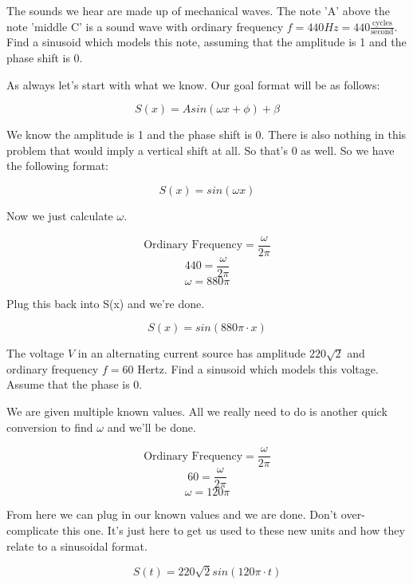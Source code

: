 \documentclass[10pt,letterpaper]{amspset}
\begin{document}

\begin{problem}[1]
    The sounds we hear are made up of mechanical waves. The note 'A' above the note 'middle C' is a sound wave with ordinary frequency $f = 440Hz = 440 \frac{\text{cycles}}{\text{second}}$. Find a sinusoid which models this note, assuming that the amplitude is 1 and the phase shift is 0.
\end{problem}

\begin{solution}
    As always let's start with what we know. Our goal format will be as follows: 
    
    \[S(x) = A sin(\omega x + \phi) + \beta\]
    
    We know the amplitude is 1 and the phase shift is 0. There is also nothing in this problem that would imply a vertical shift at all. So that's 0 as well. So we have the following format:
    
    \[S(x) = sin(\omega x) \]
    
    Now we just calculate $\omega$. 
    
    \[\text{Ordinary Frequency} = \frac{\omega}{2\pi}\]
    \[440 = \frac{\omega}{2\pi}\]
    \[\omega = 880\pi\]
    
    Plug this back into S(x) and we're done.
    
    \[\boxed{ S(x) = sin(880\pi \cdot x)  }\]
\end{solution}


\begin{problem}[2]
    The voltage $V$ in an alternating current source has amplitude $220\sqrt{2}$ and ordinary frequency $f = 60$ Hertz. Find a sinusoid which models this voltage. Assume that the phase is 0. 
\end{problem}

\begin{solution}
    We are given multiple known values. All we really need to do is another quick conversion to find $\omega$ and we'll be done. 
    
    \[\text{Ordinary Frequency} = \frac{\omega}{2\pi}\]
    \[60 = \frac{\omega}{2\pi}\]
    \[\omega = 120\pi\]
    
    From here we can plug in our known values and we are done. Don't over-complicate this one. It's just here to get us used to these new units and how they relate to a sinusoidal format.
    
    \[\boxed{ S(t) = 220\sqrt{2} sin (120\pi \cdot t) }\]
\end{solution}
\end{document}
